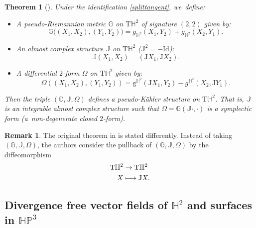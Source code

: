 \documentclass[JEP,XML,SOM,Unicode,NoEqCountersInSection, NoFloatCountersInSection,published]{cedram}
\newcommand\mto{\mathchoice{\longmapsto}{\mapsto}{\mapsto}{\mapsto}}
\theoremstyle{plain}
\newtheorem{theorem}[cor]{Theorem}
\theoremstyle{definition}
\newtheorem{remark}[cor]{Remark}
\newcommand{\HP}{\mathbb{HP}^3}
\begin{document}
\begin{theorem}[\cite{canonical_pseudo}]\label{canonical_pseudo}
Under the identification \eqref{splittangent}, we~define:
\begin{itemize}
\item A pseudo-Riemannian metric $\mathbb{G}$ on $\mathrm{T}\mathbb{H}^2$ of signature $(2,2)$ given by:
\[
\mathbb{G}\big((X_1,X_2),(Y_1,Y_2)\big)=g_{\mathbb{H}^2}(X_1,Y_2)+g_{\mathbb{H}^2}(X_2,Y_1).
\]
\item An almost complex structure $\mathbb{J}$ on $\mathrm{T}\mathbb{H}^2$ (\ie $\mathbb{J}^2=-\mathrm{Id}$):
\[
\mathbb{J}(X_1,X_2)=(\mathrm{J}X_1,\mathrm{J}X_2).
\]
\item A differential $2$-form $\Omega$ on $\mathrm{T}\mathbb{H}^2$ given by:
\[
\Omega((X_1,X_2),(Y_1,Y_2))=\mathrm{g}^{\mathbb{H}^2}(\mathrm{J}X_1,Y_2)-g^{\mathbb{H}^{2}}(X_2,\mathrm{J}Y_1).
\]
\end{itemize}
Then the triple $(\mathbb{G},\mathbb{J},\Omega)$ defines a pseudo-Kähler structure on $\mathrm{T}\mathbb{H}^2$. That is, $\mathbb{J}$ is an integrable almost complex structure such that $\Omega=\mathbb{G}(\mathbb{J}\cdot,\cdot)$ is a symplectic form (a~non-degenerate closed $2$-form).
\end{theorem}
\begin{remark}
The original theorem in \cite{canonical_pseudo} is stated differently. Instead of taking $(\mathbb{G},\mathbb{J},\Omega)$, the authors consider the pullback of $(\mathbb{G},\mathbb{J},\Omega)$ by the diffeomorphism
\[
\begin{aligned}
\mathrm{T}\mathbb{H}^2 & \to \mathrm{T}\mathbb{H}^2 \\
X & \mto \mathrm{J}X.
\end{aligned}
\]
\end{remark}

\subsection{Divergence free vector fields of \texorpdfstring{$\mathbb{H}^2$}{H2}
and surfaces in \texorpdfstring{$\HP$}{HP}}
\end{document}
